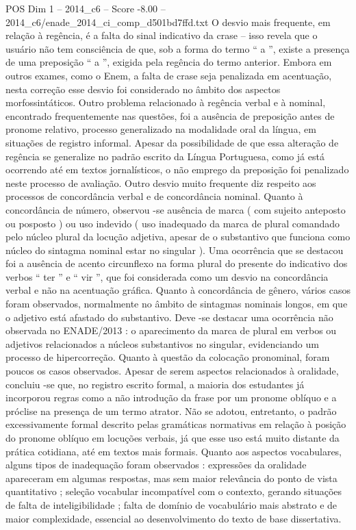 \begin{textsample}{POS Dim 1 – 2014\_c6 – Score -8.00 – 2014\_c6/enade\_2014\_ci\_comp\_d501bd7ffd.txt}
O desvio mais frequente, em relação à regência, é a falta do sinal indicativo da crase – isso revela que o usuário não tem consciência de que, sob a forma do termo “ a ”, existe a presença de uma preposição “ a ”, exigida pela regência do termo anterior.
Embora em outros exames, como o Enem, a falta de crase seja penalizada em acentuação, nesta correção esse desvio foi considerado no âmbito dos aspectos morfossintáticos.
Outro problema relacionado à regência verbal e à nominal, encontrado frequentemente nas questões, foi a ausência de preposição antes de pronome relativo, processo generalizado na modalidade oral da língua, em situações de registro informal.
Apesar da possibilidade de que essa alteração de regência se generalize no padrão escrito da Língua Portuguesa, como já está ocorrendo até em textos jornalísticos, o não emprego da preposição foi penalizado neste processo de avaliação.
Outro desvio muito frequente diz respeito aos processos de concordância verbal e de concordância nominal.
Quanto à concordância de número, observou -se ausência de marca ( com sujeito anteposto ou posposto ) ou uso indevido ( uso inadequado da marca de plural comandado pelo núcleo plural da locução adjetiva, apesar de o substantivo que funciona como núcleo do sintagma nominal estar no singular ).
Uma ocorrência que se destacou foi a ausência de acento circunflexo na forma plural do presente do indicativo dos verbos “ ter ” e “ vir ”, que foi considerada como um desvio na concordância verbal e não na acentuação gráfica.
Quanto à concordância de gênero, vários casos foram observados, normalmente no âmbito de sintagmas nominais longos, em que o adjetivo está afastado do substantivo.
Deve -se destacar uma ocorrência não observada no ENADE/2013 : o aparecimento da marca de plural em verbos ou adjetivos relacionados a núcleos substantivos no singular, evidenciando um processo de hipercorreção.
Quanto à questão da colocação pronominal, foram poucos os casos observados.
Apesar de serem aspectos relacionados à oralidade, concluiu -se que, no registro escrito formal, a maioria dos estudantes já incorporou regras como a não introdução da frase por um pronome oblíquo e a próclise na presença de um termo atrator.
Não se adotou, entretanto, o padrão excessivamente formal descrito pelas gramáticas normativas em relação à posição do pronome oblíquo em locuções verbais, já que esse uso está muito distante da prática cotidiana, até em textos mais formais.
Quanto aos aspectos vocabulares, alguns tipos de inadequação foram observados : expressões da oralidade apareceram em algumas respostas, mas sem maior relevância do ponto de vista quantitativo ; seleção vocabular incompatível com o contexto, gerando situações de falta de inteligibilidade ; falta de domínio de vocabulário mais abstrato e de maior complexidade, essencial ao desenvolvimento do texto de base dissertativa.

\end{textsample}
